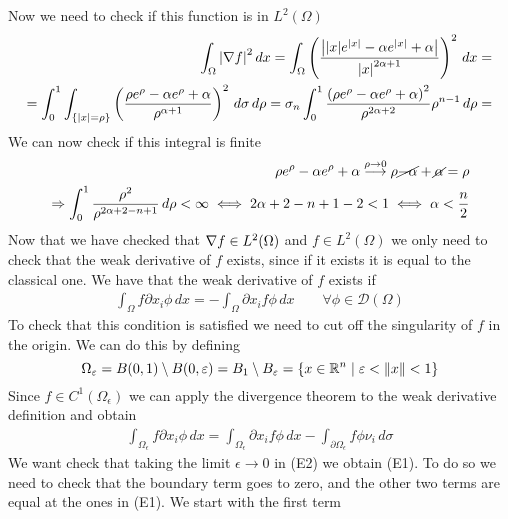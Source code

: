 Now we need to check if this function is in \(L^2(\Omega)\)
\[
    \begin{split}
        \int_\Omega \abs{\nabla f}^2 \, dx = \int_\Omega \left(\frac{\abs{\abs{x} e^{\abs{x}} - \alpha e^{\abs{x}} + \alpha}}{\abs{x}^{2\alpha + 1}}\right)^2 \, dx = \\
        = \int_0^1 \int_{\left\{\abs{x} = \rho\right\}} \left(\frac{\rho e^{\rho} - \alpha e^{\rho} + \alpha}{\rho^{\alpha + 1}}\right)^2 \, d\sigma \, d\rho = \sigma_n \int_0^1 \frac{\left(\rho e^{\rho} - \alpha e^{\rho} + \alpha\right)^2}{\rho^{2\alpha + 2}} \rho^{n-1} \, d\rho = \\
    \end{split}
\]
We can now check if this integral is finite
\[
    \begin{split}
        \rho e^{\rho} - \alpha e^{\rho} + \alpha \overset{\rho \to 0}{\longrightarrow} \rho \cancel{-\alpha} + \cancel{\alpha} = \rho \\
        \Rightarrow \int_0^1 \frac{\rho^2}{\rho^{2\alpha + 2 - n + 1}} \, d\rho < \infty \iff 2\alpha + 2 - n + 1 - 2 < 1 \iff \alpha < \frac{n}{2}
    \end{split}
\]
Now that we have checked that \(\nabla f \in L^2(\Omega)\) and \(f \in L^2(\Omega)\) we only need to check that the weak derivative of \(f\) exists, since if it exists it is equal to the classical one. We have that the weak derivative of \(f\) exists if
\[
    \begin{split}
        \int_\Omega f \partial x_i \phi \, dx = - \int_\Omega \partial x_i f \phi \, dx \qquad \forall \phi \in \mathcal{D}(\Omega)
    \end{split}
    \tag*{E1}
\]
To check that this condition is satisfied we need to cut off the singularity of \(f\) in the origin. We can do this by defining
\[
    \Omega_\varepsilon = B(0, 1) \setminus B(0, \varepsilon) = B_1 \setminus B_\varepsilon = \left\{ x \in \mathbb{R}^n \mid \varepsilon < \norm{x} < 1 \right\}
\]
Since \(f \in C^1(\Omega_\epsilon)\) we can apply the divergence theorem to the weak derivative definition and obtain
\[
    \begin{split}
        \int_{\Omega_\epsilon} f \partial x_i \phi \, dx = \int_{\Omega_\epsilon} \partial x_i f \phi \, dx - \int_{\partial\Omega_\epsilon} f \phi \nu_i \, d\sigma
    \end{split}
    \tag*{E2}
\]
We want check that taking the limit \(\epsilon \to 0\) in (E2) we obtain (E1). To do so we need to check that the boundary term goes to zero, and the other two terms are equal at the ones in (E1). We start with the first term
